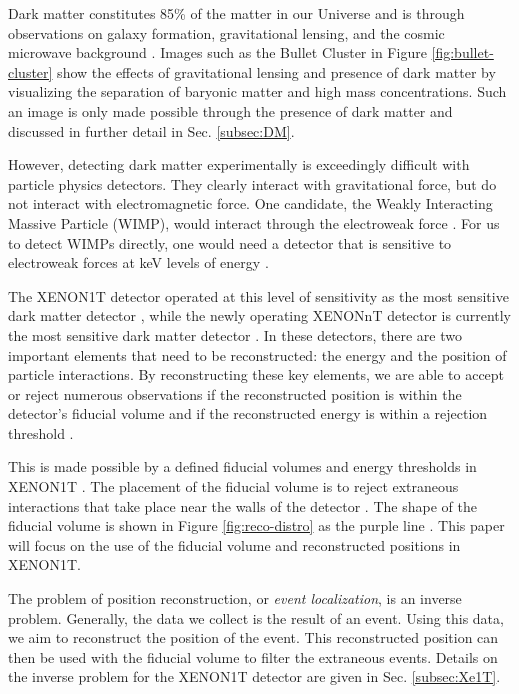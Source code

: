 \documentclass[../thesis.tex]{subfiles}
\begin{document}
Dark matter constitutes 85\% of the matter in our Universe and is through observations on galaxy formation, gravitational lensing, and the cosmic microwave background \cite{DM_Hist}.
Images such as the Bullet Cluster in Figure \ref{fig:bullet-cluster} show the effects of gravitational lensing and presence of dark matter by visualizing the separation of baryonic matter and high mass concentrations.
Such an image is only made possible through the presence of dark matter and discussed in further detail in Sec. \ref{subsec:DM}.

\par However, detecting dark matter experimentally is exceedingly difficult with particle physics detectors.
They clearly interact with gravitational force, but do not interact with electromagnetic force.
One candidate, the Weakly Interacting Massive Particle (WIMP), would interact through the electroweak force \cite{DM_Hist}.
For us to detect WIMPs directly, one would need a detector that is sensitive to electroweak forces at keV levels of energy \cite{DM_Hist}.

\par The XENON1T detector operated at this level of sensitivity as the most sensitive dark matter detector \cite{Xenon1t}, while the newly operating XENONnT detector is currently the most sensitive dark matter detector \cite{nT_Projection}.
In these detectors, there are two important elements that need to be reconstructed: the energy and the position of particle interactions.
By reconstructing these key elements, we are able to accept or reject numerous observations if the reconstructed position is within the detector's fiducial volume and if the reconstructed energy is within a rejection threshold \cite{1TDM_DataAnalysis}.

\par This is made possible by a defined fiducial volumes and energy thresholds in XENON1T \cite{1TDM_DataAnalysis}.
The placement of the fiducial volume is to reject extraneous interactions that take place near the walls of the detector \cite{1TDM_DataAnalysis}.
The shape of the fiducial volume is shown in Figure \ref{fig:reco-distro} as the purple line \cite{Xe1T-YearExpo}.
This paper will focus on the use of the fiducial volume and reconstructed positions in XENON1T.

\par The problem of position reconstruction, or \textit{event localization}, is an inverse problem.
Generally, the data we collect is the result of an event.
Using this data, we aim to reconstruct the position of the event.
This reconstructed position can then be used with the fiducial volume to filter the extraneous events.
Details on the inverse problem for the XENON1T detector are given in Sec. \ref{subsec:Xe1T}.
\end{document}
